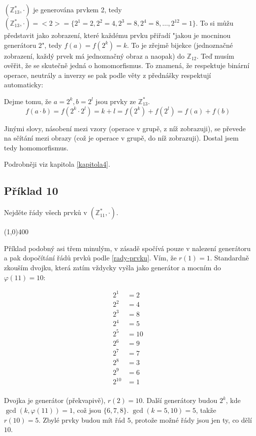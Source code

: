 \documentclass{article}
\begin{document}
$(\mathbb{Z}_{13}^{*},\cdot)$ je generována prvkem 2, tedy $(\mathbb{Z}_{13}^{*},\cdot) = {<}2{>} = \{2^1=2, 2^2=4, 2^3=8, 2^4 = 8,\ldots,2^{12}=1\}$. To si můžu představit jako zobrazení, které každému prvku přiřadí "jakou je mocninou generátoru 2", tedy $f(a)=f(2^k)=k$. To je zřejmě bijekce (jednoznačné zobrazení, každý prvek má jednoznačný obraz a naopak) do $\mathbb{Z}_{12}$. Teď musím ověřit, že se skutečně jedná o homomorfismus. To znamená, že respektuje binární operace, neutrály a inverzy se pak podle věty z přednášky respektují automaticky:

Dejme tomu, že $a = 2^k, b = 2^l$ jsou prvky ze $\mathbb{Z}_{13}^{*}$.
\[ f(a\cdot b) = f(2^k \cdot 2^l) = k + l = f(2^k) + f(2^l) = f(a) + f(b) \]

Jinými slovy, násobení mezi vzory (operace v grupě, z níž zobrazuji), se převede na sčítání mezi obrazy (což je operace v grupě, do níž zobrazuji). Dostal jsem tedy homomorfismus.   

Podrobněji viz kapitola \ref{kapitola4}.


\subsection{Příklad 10}
Nejděte řády všech prvků v $(\mathbb{Z}_{11}^*, \cdot)$.

\line(1,0){400}

Příklad podobný asi třem minulým, v zásadě spočívá pouze v nalezení generátoru a pak dopočítání řádů prvků podle \ref{rady-prvku}. Vím, že $r(1) = 1$. Standardně zkouším dvojku, která zatím vždycky vyšla jako generátor a mocním do $\varphi(11) = 10$:

\begin{align*}
2^1 & = 2\\
2^2 & = 4\\
2^3 & = 8\\
2^4 & = 5\\
2^5 & = 10\\
2^6 & = 9\\
2^7 & = 7\\
2^8 & = 3\\
2^9 & = 6\\
2^{10} & = 1\\
\end{align*}

Dvojka je generátor (překvapivě), $r(2) = 10$. Další generátory budou $2^k$, kde $\gcd(k, \varphi(11)) = 1$, což jsou $\{6,7,8\}$. $\gcd(k = 5,10) = 5$, takže $r(10) = 5$. Zbylé prvky budou mít řád $5$, protože možné řády jsou jen ty, co dělí $10$.  
\end{document}
